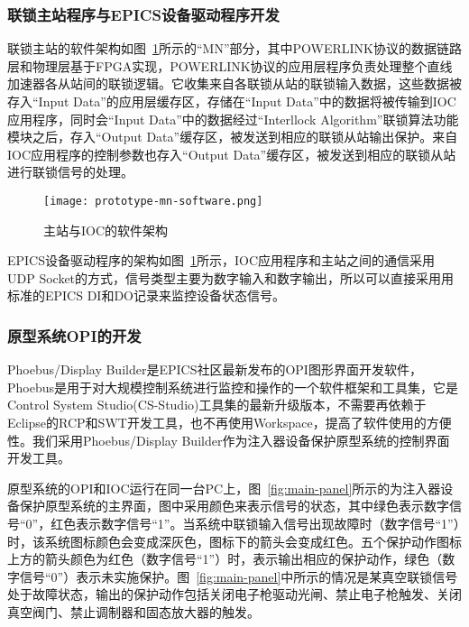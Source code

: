 \subsubsection{联锁主站程序与EPICS设备驱动程序开发}

联锁主站的软件架构如图~\ref{fig:prototype-mn-software}所示的“MN”部分，其中POWERLINK协议的数据链路层和物理层基于FPGA实现，POWERLINK协议的应用层程序负责处理整个直线加速器各从站间的联锁逻辑。它收集来自各联锁从站的联锁输入数据，这些数据被存入“Input Data”的应用层缓存区，存储在“Input Data”中的数据将被传输到IOC应用程序，同时会“Input Data”中的数据经过“Interllock Algorithm”联锁算法功能模块之后，存入“Output Data”缓存区，被发送到相应的联锁从站输出保护。来自IOC应用程序的控制参数也存入“Output Data”缓存区，被发送到相应的联锁从站进行联锁信号的处理。 

\begin{figure}[!htb]
	\centering
	\texttt{[image: prototype-mn-software.png]}
	\caption{主站与IOC的软件架构}
	\label{fig:prototype-mn-software}
\end{figure}

EPICS设备驱动程序的架构如图~\ref{fig:prototype-mn-software}所示，IOC应用程序和主站之间的通信采用UDP Socket的方式，信号类型主要为数字输入和数字输出，所以可以直接采用用标准的EPICS DI和DO记录来监控设备状态信号。

\subsubsection{原型系统OPI的开发}

Phoebus/Display Builder是EPICS社区最新发布的OPI图形界面开发软件，Phoebus是用于对大规模控制系统进行监控和操作的一个软件框架和工具集，它是Control System Studio(CS-Studio)工具集的最新升级版本，不需要再依赖于Eclipse的RCP和SWT开发工具，也不再使用Workspace，提高了软件使用的方便性。我们采用Phoebus/Display Builder作为注入器设备保护原型系统的控制界面开发工具。

原型系统的OPI和IOC运行在同一台PC上，图~\ref{fig:main-panel}所示的为注入器设备保护原型系统的主界面，图中采用颜色来表示信号的状态，其中绿色表示数字信号“0”，红色表示数字信号“1”。当系统中联锁输入信号出现故障时（数字信号“1”）时，该系统图标颜色会变成深灰色，图标下的箭头会变成红色。五个保护动作图标上方的箭头颜色为红色（数字信号“1”）时，表示输出相应的保护动作，绿色（数字信号“0”）表示未实施保护。图~\ref{fig:main-panel}中所示的情况是某真空联锁信号处于故障状态，输出的保护动作包括关闭电子枪驱动光闸、禁止电子枪触发、关闭真空阀门、禁止调制器和固态放大器的触发。

